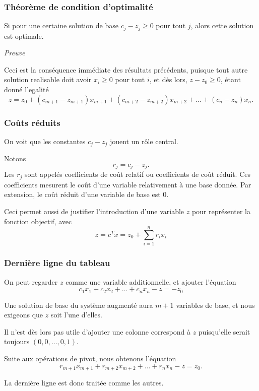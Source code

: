 \documentclass[t,usepdftitle=false]{beamer}
\begin{document}
\begin{frame}
\frametitle{Théorème de condition d'optimalité}

Si pour une certaine solution de base $c_j - z_j \geq 0$ pour tout $j$, alors cette solution est optimale.

\mbox{}

\textit{Preuve}

Ceci est la conséquence immédiate des résultats précédents, puisque tout autre solution realisable doit avoir $x_i \geq 0$ pour tout $i$, et dès lors, $z - z_0 \geq 0$, étant donné l'egalité
\[
z = z_0 + (c_{m+1} - z_{m+1})x_{m+1}
+ (c_{m+2} - z_{m+2})x_{m+2} + \ldots
+ (c_{n} - z_n) x_{n}.
\]
\end{frame}

\begin{frame}
\frametitle{Coûts réduits}

On voit que les constantes $c_j - z_j$ jouent un rôle central.

\mbox{}

Notons
\[
r_j = c_j - z_j.
\] 
Les $r_j$ sont appelés coefficients de coût relatif ou coefficients de coût réduit. Ces coefficients mesurent le coût d'une variable relativement à une base donnée. Par extension, le coût réduit d'une variable de base est 0.

\mbox{}

Ceci permet aussi de justifier l'introduction d'une variable $z$ pour représenter la fonction objectif, avec
$$
z = c^Tx = z_0 + \sum_{i = 1}^n r_i x_i
$$

\end{frame}

\begin{frame}
	\frametitle{Dernière ligne du tableau}
	
	On peut regarder $z$ comme une variable additionnelle, et ajouter l'équation
	\[
	c_1x_1 + c_2x_2 + \ldots + c_nx_n - z = -z_0
	\]
	
	\mbox{}
	
	Une solution de base du système augmenté aura $m+1$ variables de base, et nous exigeons que $z$ soit l'une d'elles.
	
	\mbox{}
	
	Il n'est dès lors pas utile d'ajouter une colonne correspond à $z$ puisqu'elle serait toujours $(0, 0, \ldots, 0, 1)$.
	
	\mbox{}
	
	Suite aux opérations de pivot, nous obtenons l'équation
	\[
	r_{m+1}x_{m+1} + r_{m+2}x_{m+2} + \ldots + r_nx_n - z = z_0.
	\]
	
	\mbox{}
	
	La dernière ligne est donc traitée comme les autres.
	
\end{frame}
\end{document}
